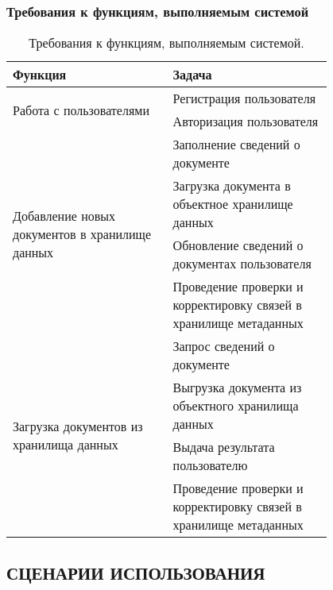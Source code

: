 \documentclass[a4paper,14pt]{extarticle}
\begin{document}
\subsubsection{Требования к функциям, выполняемым системой}
\begin{table}[h!]
	\caption{\label{tab:functions} Требования к функциям, выполняемым системой.}
	\begin{center}\small
		\begin{tabular}{|m{0.4\linewidth}|m{0.4\linewidth}|}
			\hline
			\textbf{Функция} & \textbf{Задача}\\
			\hline
			
			\multirow{2}{0.95\linewidth}{Работа с пользователями}
			& Регистрация пользователя \\\cline{2-2}
			& Авторизация пользователя \\\hline

			\multirow{4}{0.95\linewidth}{Добавление новых документов в хранилище данных} 
			& Заполнение сведений о документе \\\cline{2-2}
			& Загрузка документа в объектное хранилище данных \\\cline{2-2}
			& Обновление сведений о документах пользователя \\\cline{2-2}
			& Проведение проверки и корректировку связей в хранилище метаданных \\\hline
			
			\multirow{4}{0.95\linewidth}{Загрузка документов из хранилища данных} 
			& Запрос сведений о документе \\\cline{2-2}
			& Выгрузка документа из объектного хранилища данных \\\cline{2-2}
			& Выдача результата пользователю \\\cline{2-2}
			& Проведение проверки и корректировку связей в хранилище метаданных \\\hline
			
			
		\end{tabular}
	\end{center}
\end{table}
\newpage
\subsection{СЦЕНАРИИ ИСПОЛЬЗОВАНИЯ}
\end{document}

